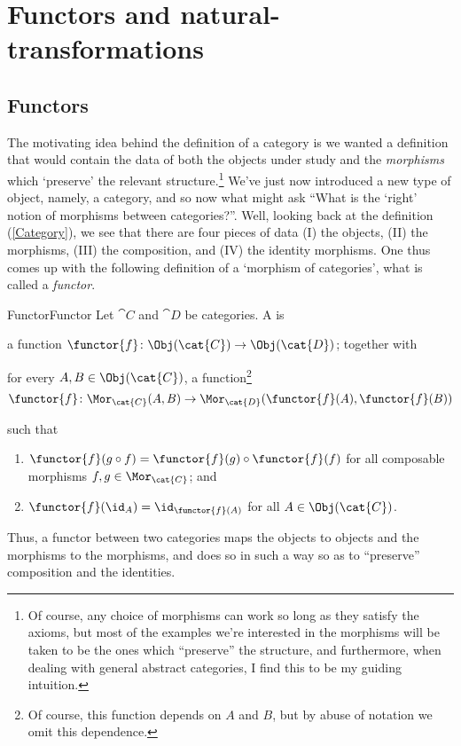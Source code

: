 \section{Functors and natural-transformations}

\subsection{Functors}

The motivating idea behind the definition of a category is we wanted a definition that would contain the data of both the objects under study and the \emph{morphisms} which `preserve' the relevant structure.\footnote{Of course, any choice of morphisms can work so long as they satisfy the axioms, but most of the examples we're interested in the morphisms will be taken to be the ones which ``preserve'' the structure, and furthermore, when dealing with general abstract categories, I find this to be my guiding intuition.}  We've just now introduced a new type of object, namely, a category, and so now what might ask ``What is the `right' notion of morphisms between categories?''.  Well, looking back at the definition (\cref{Category}), we see that there are four pieces of data (I) the objects, (II) the morphisms, (III) the composition, and (IV) the identity morphisms.  One thus comes up with the following definition of a `morphism of categories', what is called a \emph{functor}.
\begin{dfn}{Functor}{Functor}
	Let $\cat{C}$ and $\cat{D}$ be categories.  A  is
	\begin{data}
		\item a function $\functor{f}\colon \Obj (\cat{C})\rightarrow \Obj (\cat{D})$; together with
		\item for every $A,B\in \Obj (\cat{C})$, a function\footnote{Of course, this function depends on $A$ and $B$, but by abuse of notation we omit this dependence.}
		\begin{equation}
		\functor{f}\colon \Mor _{\cat{C}}(A,B)\rightarrow \Mor _{\cat{D}}(\functor{f}(A),\functor{f}(B))
		\end{equation}
	\end{data}
	such that
	\begin{enumerate}
		\item $\functor{f}(g\circ f)=\functor{f}(g)\circ \functor{f}(f)$ for all composable morphisms $f,g\in \Mor _{\cat{C}}$; and
		\item $\functor{f}(\id _A)=\id _{\functor{f}(A)}$ for all $A\in \Obj (\cat{C})$.
	\end{enumerate}
	\begin{rmk}
		Thus, a functor between two categories maps the objects to objects and the morphisms to the morphisms, and does so in such a way so as to ``preserve'' composition and the identities.
	\end{rmk}
\end{dfn}
